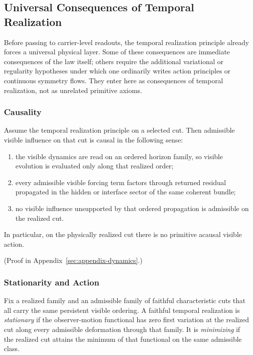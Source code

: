 \subsection{Universal Consequences of Temporal Realization}

Before passing to carrier-level readouts, the temporal realization principle
already forces a universal physical layer. Some of these consequences are
immediate consequences of the law itself; others require the additional
variational or regularity hypotheses under which one ordinarily writes action
principles or continuous symmetry flows. They enter here as consequences of
temporal realization, not as unrelated primitive axioms.

\subsubsection{Causality}

\begin{theorem}
\label{thm:temporal-realization-forces-causal-propagation}
Assume the temporal realization principle on a selected cut. Then admissible
visible influence on that cut is causal in the following sense:
\begin{enumerate}[label=(\roman*), leftmargin=2em, itemsep=0.2em]
\item the visible dynamics are read on an ordered horizon family, so visible
      evolution is evaluated only along that realized order;
\item every admissible visible forcing term factors through returned residual
      propagated in the hidden or interface sector of the same coherent bundle;
\item no visible influence unsupported by that ordered propagation is
      admissible on the realized cut.
\end{enumerate}
In particular, on the physically realized cut there is no primitive acausal
visible action.
\end{theorem}

(Proof in Appendix~\ref{sec:appendix-dynamics}.)

\subsubsection{Stationarity and Action}

\begin{definition}
\label{def:stationary-faithful-temporal-realization}
Fix a realized family and an admissible family of faithful characteristic cuts
that all carry the same persistent visible ordering. A faithful temporal
realization is \emph{stationary} if the observer-motion functional has zero
first variation at the realized cut along every admissible deformation through
that family. It is \emph{minimizing} if the realized cut attains the minimum of
that functional on the same admissible class.
\end{definition}

